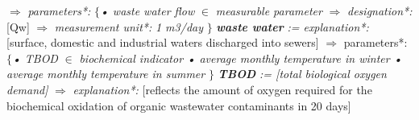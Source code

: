 \documentclass{article}
\begin{document}
\begin{multicols}{2}
{}
$\Rightarrow$ \textit{parameters*:}
\vspace{

}
\textit{$\{$• waste water flow}
\vspace{

}
$\in$ \textit{measurable parameter}
\vspace{

}
$\Rightarrow$\textit{ designation*:}
\vspace{

}
[Qw]
\vspace{

}
$\Rightarrow$\textit{ measurement unit*:}
\vspace{

}
\textit{1 m3/day}
\vspace{

}
$\}$
\vspace{

}
\textbf{\textit{waste water}}
\vspace{

}
\textit{:= explanation*:}
\vspace{

}
[surface, domestic and industrial waters discharged
into sewers]
\vspace{

}
$\Rightarrow$ parameters*:
\vspace{

}
\textit{$\{$• TBOD}
\vspace{

}
$\in$ \textit{biochemical indicator}
\vspace{

}
\textit{• average monthly temperature in winter}
\vspace{

}
\textit{• average monthly temperature in summer}
\vspace{

}
$\}$
\vspace{

}
\textbf{\textit{TBOD}}
\vspace{

}
\textit{:= [total biological oxygen demand]}
\vspace{

}
$\Rightarrow$\textit{ explanation*:}
\vspace{

}
[reflects the amount of oxygen required for the biochemical oxidation of organic wastewater 
contaminants in 20 days]
\vspace{

}
\end{multicols}
\end{document}
